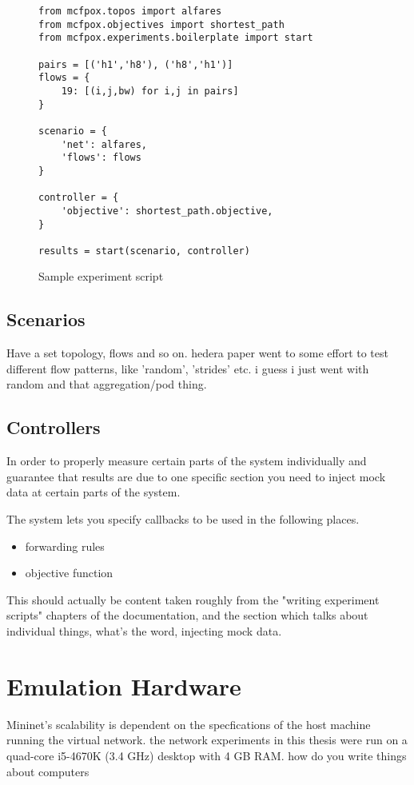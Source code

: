 \begin{figure}
\begin{lstlisting}
from mcfpox.topos import alfares
from mcfpox.objectives import shortest_path
from mcfpox.experiments.boilerplate import start

pairs = [('h1','h8'), ('h8','h1')]
flows = {
    19: [(i,j,bw) for i,j in pairs]
}

scenario = {
    'net': alfares,
    'flows': flows
}

controller = {
    'objective': shortest_path.objective,
}

results = start(scenario, controller)
\end{lstlisting}
\caption{Sample experiment script}
\label{fig:script}
\end{figure}

\subsection{Scenarios}
Have a set topology, flows and so on. hedera paper went to some effort to test different flow patterns, like 'random', 'strides' etc. i guess i just went with random and that aggregation/pod thing. 

\subsection{Controllers}
In order to properly measure certain parts of the system individually and guarantee that results are due to one specific section you need to inject mock data at certain parts of the system.

The system lets you specify callbacks to be used in the following places.

\begin{itemize}
\item forwarding rules
\item objective function
\end{itemize}

This should actually be content taken roughly from the "writing experiment scripts" chapters of the documentation, and the section which talks about individual things, what's the word, injecting mock data.

\section{Emulation Hardware}

Mininet's scalability is dependent on the specfications of the host machine running the virtual network. the network experiments in this thesis were run on a quad-core i5-4670K (3.4 GHz) desktop with 4 GB RAM. how do you write things about computers
